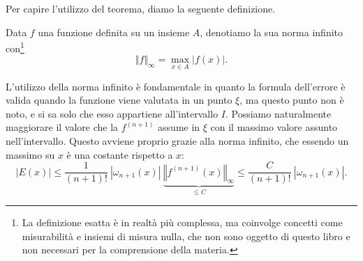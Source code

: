 Per capire l'utilizzo del teorema, diamo la seguente definizione.
\begin{definition}
	Data $f$ una funzione definita su un insieme $A$, denotiamo la sua norma infinito con\footnote{La definizione esatta è in realtà più complessa, ma coinvolge concetti come misurabilità e insiemi di misura nulla, che non sono oggetto di questo libro e non necessari per la comprensione della materia.}
	\begin{equation*}
		\Vert f\Vert _{\infty} =\max_{x\in A} \left|f(x)\right|.
	\end{equation*}
\end{definition}

L'utilizzo della norma infinito è fondamentale in quanto la formula dell'errore è valida quando la funzione viene valutata in un punto $\xi$, ma questo punto non è noto, e si sa solo che esso appartiene all'intervallo $I$.
Possiamo naturalmente maggiorare il valore che la $f^{(n+1)}$ assume in $\xi$ con il massimo valore assunto nell'intervallo. Questo avviene proprio grazie alla norma infinito, che essendo un massimo su $x$ è una costante rispetto a $x$:
\begin{equation*}
| E(x)| \leqslant \frac{1}{( n+1) !} \ | \omega _{n+1}(x)| \ \underbrace{\left\Vert f^{( n+1)}(x)\right\Vert _{\infty }}_{\leqslant C} \leqslant \frac{C}{( n+1) !} \ | \omega _{n+1}(x)|.
\end{equation*}

